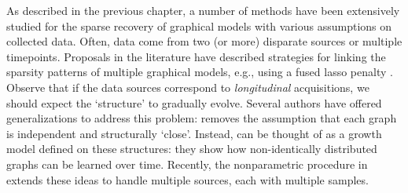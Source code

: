 As described in the previous chapter, a number of methods have been extensively studied for 
the sparse recovery of graphical models
with various assumptions on collected data.
Often, data come from two (or more) disparate sources or multiple timepoints.
Proposals in the literature have 
described strategies for linking the sparsity patterns of multiple graphical models, e.g., using a fused lasso 
penalty \citep{danaher2014joint,yang2015fused}. Observe that 
if the data sources correspond to {\em longitudinal} acquisitions, we should expect 
the `structure' to gradually evolve.
Several authors have offered generalizations to address this problem: \cite{zhou2010time} removes the assumption
that each graph is independent and structurally `close'.
Instead, \cite{zhou2010time} can be thought of as a growth model \citep{mcardle2000introduction} defined on these structures: they show how non-identically distributed graphs can be learned over time. 
Recently, the nonparametric procedure in \cite{qiu2015joint} extends these ideas
to handle multiple sources, each with multiple samples.

